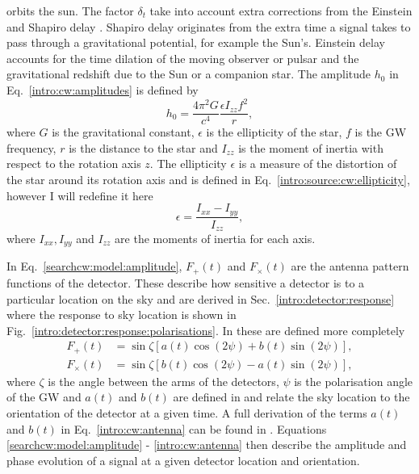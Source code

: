 orbits the sun. The factor $\delta_t$ take into account extra
corrections from the Einstein and Shapiro delay
\citep{taylor1992PulsarTiming}.  Shapiro delay originates from the extra time a signal takes to pass through a gravitational potential, for example the Sun's. Einstein delay accounts for the time dilation of the moving observer or pulsar and the gravitational redshift due to the Sun or a companion star. The amplitude
$h_0$ in Eq.~\ref{intro:cw:amplitudes} is defined by
%
\begin{equation}
    h_0 = \frac{4 \pi^2 G}{c^4} \frac{\epsilon I_{zz} f^2}{r},
\end{equation}
%
where $G$ is the gravitational constant, $\epsilon$ is the ellipticity of the star, $f$
is the \gls{GW} frequency, $r$ is the distance to the star and $I_{zz}$ is the
moment of inertia with respect to the rotation axis $z$.  The ellipticity $\epsilon$ is a measure of the distortion of the star around its rotation axis and is defined in Eq.~\ref{intro:source:cw:ellipticity}, however I will redefine it here
%
\begin{equation}
    \epsilon = \frac{I_{xx} - I_{yy}}{I_{zz}},
\end{equation}
%
where $I_{xx}, I_{yy}$ and $I_{zz}$ are the moments of inertia for each axis.

In Eq.~\ref{searchcw:model:amplitude}, $F_+(t)$ and $F_{\times}(t)$ are the antenna pattern
functions of the detector.  These describe how sensitive a detector is to a
particular location on the sky and are derived in Sec.~\ref{intro:detector:response} where the response to
sky location is shown in Fig.~\ref{intro:detector:response:polarisations}.  In \citep{schutz1998DataAnalysis} these are defined more completely
%
\begin{equation}
\label{intro:cw:antenna}
\begin{split}
F_{+}(t) &= \sin{\zeta}[a(t)\cos{(2\psi)} + b(t)\sin{(2\psi)}], \\
F_{\times}(t) &= \sin{\zeta}[b(t) \cos{(2\psi)} - a(t)\sin{(2\psi)}],
\end{split}
\end{equation}
%
where $\zeta$ is the angle between the arms of the detectors, $\psi$ is the
polarisation angle of the \gls{GW} and $a(t)$ and $b(t)$ are defined in
\citep{schutz1998DataAnalysis} and relate the sky location to the orientation
of the detector at a given time.  A full derivation of the terms $a(t)$ and $b(t)$ in Eq.~\ref{intro:cw:antenna} can be found in
\citep{schutz1998DataAnalysis}.
Equations \ref{searchcw:model:amplitude} - \ref{intro:cw:antenna} then describe the amplitude and phase evolution of a
signal at a given detector location and orientation.



